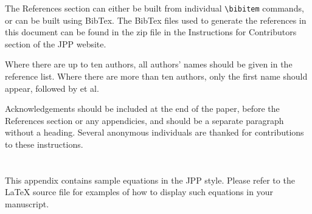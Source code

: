 \documentclass[12pt, a4paper]{article}
\begin{document}
The References section can either be built from individual \verb#\bibitem# commands, or can be built using BibTex. The BibTex files used to generate the references in this document can be found in the zip file in the Instructions for Contributors section of the JPP website.

Where there are up to ten authors, all authors' names should be given in the reference list. Where there are more than ten authors, only the first name should appear, followed by et al.

Acknowledgements should be included at the end of the paper, before the References section or any appendicies, and should be a separate paragraph without a heading. Several anonymous individuals are thanked for contributions to these instructions.

\appendix

\section{}\label{appA}
This appendix contains sample equations in the JPP style. Please refer to the {\LaTeX} source file for examples of how to display such equations in your manuscript.




% 



% 
\printbibliography
% 
\end{document}
